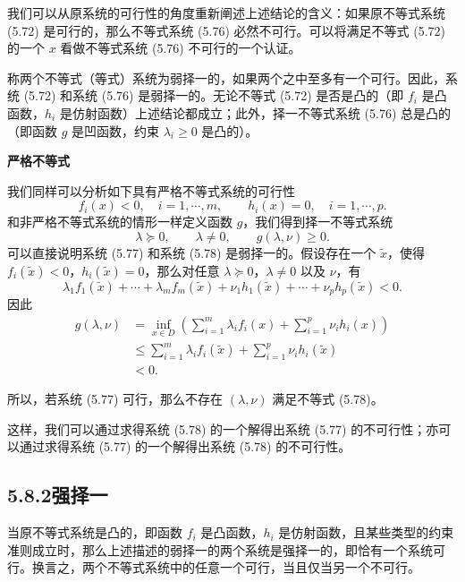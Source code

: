 \documentclass[UTF8, 12pt, fontset=fandol, oneside]{ctexart}
\begin{document}
我们可以从原系统的可行性的角度重新阐述上述结论的含义：如果原不等式系统 (5.72) 是可行的，那么不等式系统 (5.76) 必然不可行。可以将满足不等式 (5.72) 的一个 $x$ 看做不等式系统 (5.76) 不可行的一个认证。

称两个不等式（等式）系统为弱择一的，如果两个之中至多有一个可行。因此，系统 (5.72) 和系统 (5.76) 是弱择一的。无论不等式 (5.72) 是否是凸的（即 $f_i$ 是凸函数，$h_i$ 是仿射函数）上述结论都成立；此外，择一不等式系统 (5.76) 总是凸的（即函数 $g$ 是凹函数，约束 $\lambda_i\geq 0$ 是凸的）。

\noindent\textbf{严格不等式}

我们同样可以分析如下具有严格不等式系统的可行性
\begin{equation}
f_i(x)<0,\quad i=1,\cdots,m,\qquad h_i(x)=0,\quad i=1,\cdots,p.
\tag{5.77}
\end{equation}
和非严格不等式系统的情形一样定义函数 $g$，我们得到择一不等式系统
\begin{equation}
\lambda\succeq 0,\qquad \lambda\neq 0,\qquad g(\lambda,\nu)\geq 0.
\tag{5.78}
\end{equation}
可以直接说明系统 (5.77) 和系统 (5.78) 是弱择一的。假设存在一个 $\tilde{x}$，使得 $f_i(\tilde{x})<0$，$h_i(\tilde{x})=0$，那么对任意 $\lambda\succeq 0$，$\lambda\neq 0$ 以及 $\nu$，有
\[
\lambda_1f_1(\tilde{x})+\cdots+\lambda_m f_m(\tilde{x})+\nu_1h_1(\tilde{x})+\cdots+\nu_p h_p(\tilde{x})<0.
\]
因此
\[
\begin{aligned}
g(\lambda,\nu)
&=\inf_{x\in D}\left(\sum_{i=1}^m\lambda_i f_i(x)+\sum_{i=1}^p\nu_i h_i(x)\right)\\
&\leq \sum_{i=1}^m\lambda_i f_i(\tilde{x})+\sum_{i=1}^p\nu_i h_i(\tilde{x})\\
&<0.
\end{aligned}
\]

所以，若系统 (5.77) 可行，那么不存在 $(\lambda,\nu)$ 满足不等式 (5.78)。

这样，我们可以通过求得系统 (5.78) 的一个解得出系统 (5.77) 的不可行性；亦可以通过求得系统 (5.77) 的一个解得出系统 (5.78) 的不可行性。

\subsection*{5.8.2\quad 强择一}

当原不等式系统是凸的，即函数 $f_i$ 是凸函数，$h_i$ 是仿射函数，且某些类型的约束准则成立时，那么上述描述的弱择一的两个系统是强择一的，即恰有一个系统可行。换言之，两个不等式系统中的任意一个可行，当且仅当另一个不可行。
\end{document}
